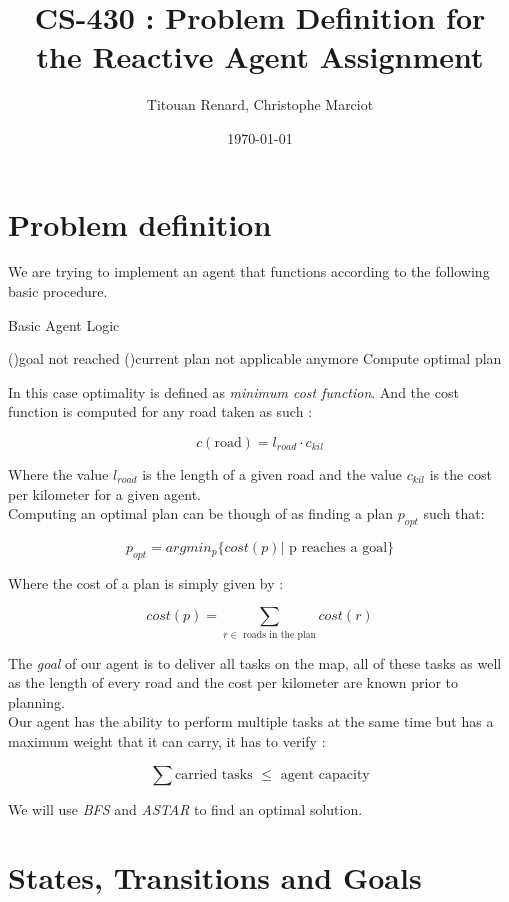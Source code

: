 \documentclass[11pt]{article}
\title{CS-430 : Problem Definition for the Reactive Agent Assignment}
\date{\today}
\author{Titouan Renard, Christophe Marciot}
\begin{document}
\maketitle	

\section{Problem definition}

We are trying to implement an agent that functions according to the following basic procedure.

\begin{algorithm}
    \SetAlgoLined
    \caption{Basic Agent Logic}
    \While(){goal not reached}{
        \If(){current plan not applicable anymore}{
            Compute optimal plan
        }
    }
\end{algorithm}

In this case optimality is defined as \emph{minimum cost function}. And the cost function is computed for any road taken as such :

\[c(\text{road}) = l_{road} \cdot c_{kil}\]

Where the value $l_{road}$ is the length of a given road and the value $c_{kil}$ is the cost per kilometer for a given agent. \\

Computing an optimal plan can be though of as finding a plan $p_{opt}$ such that:

\[p_{opt} = argmin_{p} \{ cost(p) | \text{ p reaches a goal} \}\]

Where the cost of a plan is simply given by :

\[cost(p) = \sum_{r \in \text{ roads in the plan}} cost(r)\]

The \emph{goal} of our agent is to deliver all tasks on the map, all of these tasks as well as the length of every road and the cost per kilometer are known prior to planning. \\

Our agent has the ability to perform multiple tasks at the same time but has a maximum weight that it can carry, it has to verify : 

\[\sum \text{carried tasks } \leq \text{ agent capacity}\]

We will use \emph{BFS} and \emph{ASTAR} to find an optimal solution.

\section{States, Transitions and Goals}
\end{document}
